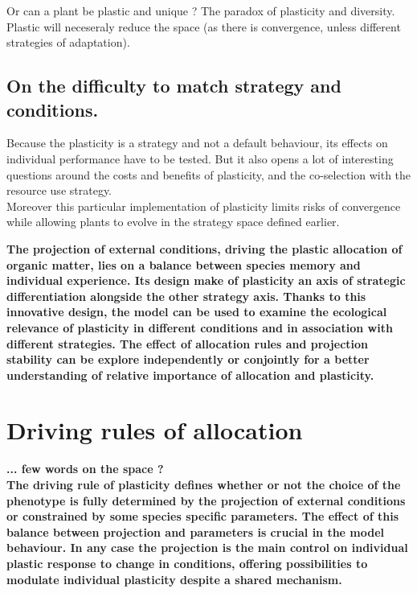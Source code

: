 Or can a plant be plastic and unique ? The paradox of plasticity and diversity.\\

Plastic will neceseraly reduce the space (as there is convergence, unless different strategies of adaptation).


\subsection{On the difficulty to match strategy and conditions.}

 Because the plasticity is a strategy and not a default behaviour, its effects on individual performance have to be tested. But it also opens a lot of interesting questions around the costs and benefits of plasticity, and the co-selection with the resource use strategy.\\

 Moreover this particular implementation of plasticity limits risks of convergence while allowing plants to evolve in the strategy space defined earlier.
 
 
\textbf{The projection of external conditions, driving the plastic allocation of organic matter, lies on a balance between species memory and individual experience. Its design make of plasticity an axis of strategic differentiation alongside the other strategy axis. Thanks to this innovative design, the model can be used to examine the ecological relevance of plasticity in different conditions and in association with different strategies. The effect of allocation rules and projection stability can be explore independently or conjointly for a better understanding of relative importance of allocation and plasticity.}


\section{Driving rules of allocation}

\textbf{... few words on the space ?\\
The driving rule of plasticity defines whether or not the choice of the  phenotype is fully determined by the projection of external conditions or constrained by some species specific parameters. The effect of this balance between projection and parameters is crucial in the model behaviour. In any case the projection is the main control on individual plastic response to change in conditions, offering possibilities to modulate individual plasticity despite a shared mechanism.}





